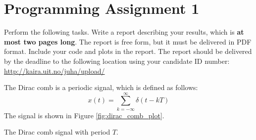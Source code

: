 \chapter{Programming Assignment 1}

Perform the following tasks. Write a report describing your results,
which is \textbf{at most two pages long}. The report is free form, but
it must be delivered in PDF format. Include your code and plots in the
report. The report should be delivered by the deadline to the
following location using your candidate ID number:
\url{http://kaira.uit.no/juha/upload/}

The Dirac comb is a periodic signal, which is defined as follows:
\begin{equation}
x(t) = \sum_{k=-\infty}^{\infty} \delta(t - k T)
\end{equation}
The signal is shown in Figure \ref{fig:dirac_comb_plot}.

\begin{marginfigure}
\begin{center}
\end{center}
\caption{The Dirac comb signal with period $T$.}
\label{fig:dirac_comb_plot}
\end{marginfigure}


